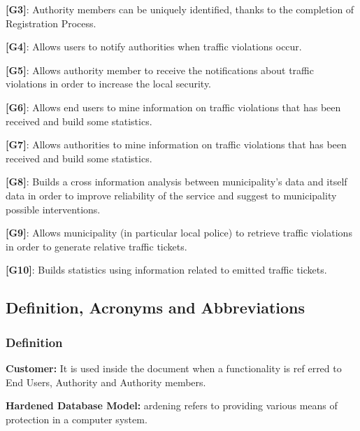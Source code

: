 \documentclass[12pt]{article}
\begin{document}
\textbf{[G3]}: Authority members can be uniquely identified, thanks to the completion of Registration Process.
\vspace{1mm}

\textbf{[G4]}: Allows users to notify authorities when traffic violations occur.
\vspace{1mm}

\textbf{[G5]}: Allows authority member to receive the notifications about traffic violations in order to increase the local security.
\vspace{1mm}

\textbf{[G6]}: Allows end users to mine information on traffic violations that has been received and build some statistics.
\vspace{1mm}

\textbf{[G7]}: Allows authorities to mine information on traffic violations that has been received and build some statistics.\vspace{1mm}

\textbf{[G8]}: Builds a cross information analysis between municipality’s data and itself data in order to improve reliability of the service and suggest to municipality possible interventions. \vspace{1mm}

\textbf{[G9]}: Allows municipality (in particular local police) to retrieve traffic violations in order to generate relative traffic tickets.\vspace{1mm}

\textbf{[G10]}: Builds statistics using information related to emitted traffic tickets.
\vspace{5mm}
\subsection{Definition, Acronyms and Abbreviations}
\vspace{5mm}
\subsubsection{Definition}
\vspace{2mm}
\begin{flushleft}

\textbf{Customer:} It is used inside the document when a functionality is ref
erred to End Users, Authority and Authority members.
\vspace{2mm}

\textbf{Hardened Database Model:} ardening refers to providing various means of protection in a computer system. 

\end{flushleft}
\end{document}
